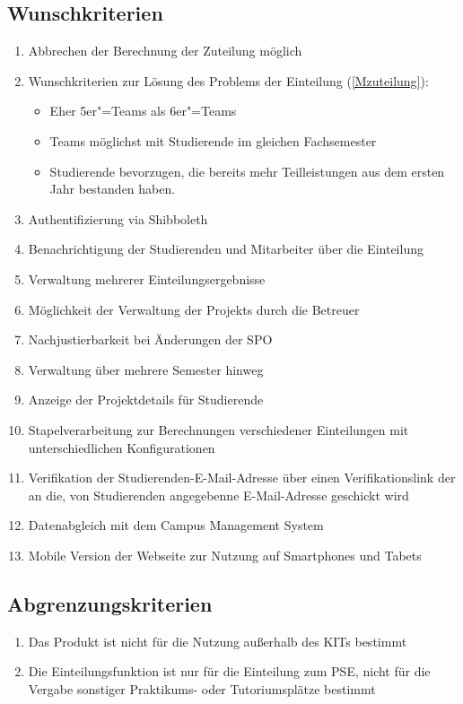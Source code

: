 \documentclass[parskip=full]{scrartcl}
\newcommand{\swtLabel}[1]{\textbf{/#1\arabic*0/}}
\begin{document}
\subsection{Wunschkriterien}
\begin{enumerate}[label=\swtLabel{W}]
  \item Abbrechen der Berechnung der Zuteilung möglich 
    
    \item Wunschkriterien zur Lösung des Problems der Einteilung (\ref{Mzuteilung}):
    \begin{itemize}
        \item Eher 5er"=Teams als 6er"=Teams
        \item Teams möglichst mit Studierende im gleichen Fachsemester 
        \item Studierende bevorzugen, die bereits mehr Teilleistungen aus dem
        ersten Jahr bestanden haben.
    \end{itemize}    
    \item Authentifizierung via Shibboleth
    \item Benachrichtigung der Studierenden und Mitarbeiter über die Einteilung
    \item Verwaltung mehrerer Einteilungsergebnisse
    \item Möglichkeit der Verwaltung der \glspl{Projekt} durch die Betreuer  %
    \item Nachjustierbarkeit bei Änderungen der SPO %
    \item Verwaltung über mehrere Semester hinweg
    \item Anzeige der Projektdetails für Studierende
    \item Stapelverarbeitung zur Berechnungen verschiedener Einteilungen mit
    unterschiedlichen Konfigurationen
    \item Verifikation der Studierenden-E-Mail-Adresse über einen
    Verifikationslink der an die, von Studierenden angegebenne E-Mail-Adresse
    geschickt wird
    \item Datenabgleich mit dem Campus Management System %
    \item Mobile Version der Webseite zur Nutzung auf Smartphones und Tabets
    
    
    
\end{enumerate}

\subsection{Abgrenzungskriterien}
\begin{enumerate}[label=\swtLabel{AG}]
 
  \item Das Produkt ist nicht für die Nutzung außerhalb des KITs bestimmt %

\item Die Einteilungsfunktion ist nur für die Einteilung zum PSE, nicht
für die Vergabe sonstiger Praktikums- oder Tutoriumsplätze bestimmt
  
\end{enumerate}
\end{document}
